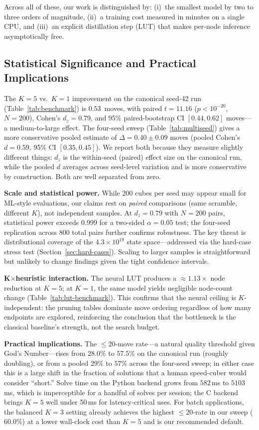 \documentclass[graybox]{svmult}
\begin{document}
Across all of these, our work is distinguished by: (i)~the smallest model by two to three orders of magnitude, (ii)~a training cost measured in minutes on a single CPU, and (iii)~an explicit distillation step (LUT) that makes per-node inference asymptotically free.

\subsection{Statistical Significance and Practical Implications}
\label{sec:stat-practical}

The $K{=}5$ vs.\ $K{=}1$ improvement on the canonical seed-42 run (Table~\ref{tab:benchmark}) is $0.53$~moves, with paired $t = 11.16$ ($p < 10^{-20}$, $N=200$), Cohen's $d_z = 0.79$, and 95\% paired-bootstrap CI $[0.44, 0.62]$ moves---a medium-to-large effect. The four-seed sweep (Table~\ref{tab:multiseed}) gives a more conservative pooled estimate of $\Delta = 0.40 \pm 0.09$ moves (pooled Cohen's $d = 0.59$, 95\% CI $[0.35, 0.45]$). We report both because they measure slightly different things: $d_z$ is the within-seed (paired) effect size on the canonical run, while the pooled $d$ averages across seed-level variation and is more conservative by construction. Both are well separated from zero.

\textbf{Scale and statistical power.} While 200 cubes per seed may appear small for ML-style evaluations, our claims rest on \emph{paired} comparisons (same scramble, different $K$), not independent samples. At $d_z = 0.79$ with $N = 200$ pairs, statistical power exceeds 0.999 for a two-sided $\alpha = 0.05$ test; the four-seed replication across 800 total pairs further confirms robustness. The key threat is distributional coverage of the $4.3 \times 10^{19}$ state space---addressed via the hard-case stress test (Section~\ref{sec:hard-cases}). Scaling to larger samples is straightforward but unlikely to change findings given the tight confidence intervals.

\textbf{K$\times$heuristic interaction.} The neural LUT produces a $\approx$$1.13\times$ node reduction at $K{=}5$; at $K{=}1$, the same model yields negligible node-count change (Table~\ref{tab:lut-benchmark}). This confirms that the neural ceiling is $K$-independent: the pruning tables dominate move ordering regardless of how many endpoints are explored, reinforcing the conclusion that the bottleneck is the classical baseline's strength, not the search budget.

\textbf{Practical implications.} The $\leq$20-move rate---a natural quality threshold given God's Number---rises from $28.0\%$ to $57.5\%$ on the canonical run (roughly doubling), or from a pooled $29\%$ to $57\%$ across the four-seed sweep; in either case this is a large shift in the fraction of solutions that a human speed-cuber would consider ``short.'' Solve time on the Python backend grows from $582$\,ms to $5103$\,ms, which is imperceptible for a handful of solves per session; the C backend brings $K{=}5$ well under 50\,ms for latency-critical uses. For batch applications, the balanced $K{=}3$ setting already achieves the highest $\leq$20-rate in our sweep ($60.0\%$) at a lower wall-clock cost than $K{=}5$ and is our recommended default.
\end{document}
